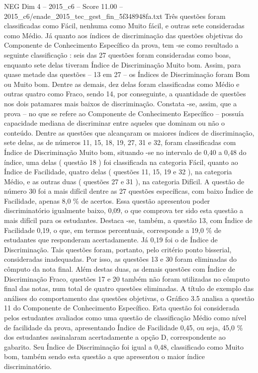 \begin{textsample}{NEG Dim 4 – 2015\_c6 – Score 11.00 – 2015\_c6/enade\_2015\_tec\_gest\_fin\_5f348948fa.txt}
Três questões foram classificadas como Fácil, nenhuma como Muito fácil, e outras sete consideradas como Médio.
Já quanto aos índices de discriminação das questões objetivas do Componente de Conhecimento Específico da prova, tem -se como resultado a seguinte classificação : seis das 27 questões foram consideradas como boas, enquanto sete delas tiveram Índice de Discriminação Muito bom.
Assim, para quase metade das questões – 13 em 27 – os Índices de Discriminação foram Bom ou Muito bom.
Dentre as demais, dez delas foram classificadas como Médio e outras quatro como Fraco, sendo 14, por conseguinte, a quantidade de questões nos dois patamares mais baixos de discriminação.
Constata -se, assim, que a prova – no que se refere ao Componente de Conhecimento Específico – possuía capacidade mediana de discriminar entre aqueles que dominam ou não o conteúdo.
Dentre as questões que alcançaram os maiores índices de discriminação, sete delas, as de números 11, 15, 18, 19, 27, 31 e 32, foram classificadas com Índice de Discriminação Muito bom, situando -se no intervalo de 0,40 a 0,48 do índice, uma delas ( questão 18 ) foi classificada na categoria Fácil, quanto ao Índice de Facilidade, quatro delas ( questões 11, 15, 19 e 32 ), na categoria Médio, e as outras duas ( questões 27 e 31 ), na categoria Difícil.
A questão de número 30 foi a mais difícil dentre as 27 questões específicas, com baixo Índice de Facilidade, apenas 8,0 \% de acertos.
Essa questão apresentou poder discriminatório igualmente baixo, 0,09, o que comprova ter sido esta questão a mais difícil para os estudantes.
Destaca -se, também, a questão 13, com Índice de Facilidade 0,19, o que, em termos percentuais, corresponde a 19,0 \% de estudantes que responderam acertadamente.
Já 0,19 foi o de Índice de Discriminação.
Tais questões foram, portanto, pelo critério ponto bisserial, consideradas inadequadas.
Por isso, as questões 13 e 30 foram eliminadas do cômputo da nota final.
Além destas duas, as demais questões com Índice de Discriminação Fraco, questões 17 e 20 também não foram utilizadas no cômputo final das notas, num total de quatro questões eliminadas.
A título de exemplo das análises do comportamento das questões objetivas, o Gráfico 3.5 analisa a questão 11 do Componente de Conhecimento Específico.
Esta questão foi considerada pelos estudantes avaliados como uma questão de classificação Médio como nível de facilidade da prova, apresentando Índice de Facilidade 0,45, ou seja, 45,0 \% dos estudantes assinalaram acertadamente a opção D, correspondente ao gabarito.
Seu Índice de Discriminação foi igual a 0,48, classificado como Muito bom, também sendo esta questão a que apresentou o maior índice discriminatório.

\end{textsample}
